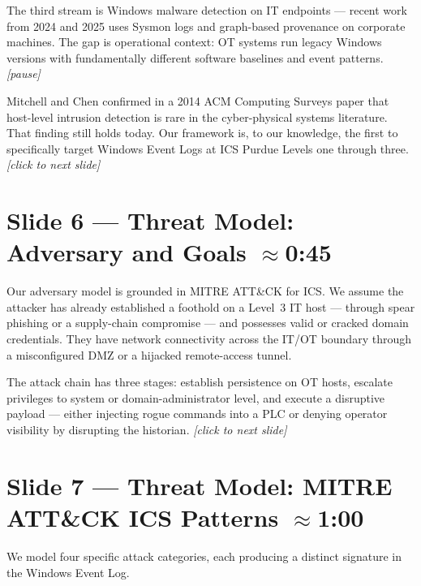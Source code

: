 \documentclass[14pt]{article}
\begin{document}
The third stream is Windows malware detection on IT endpoints --- recent work from 2024 and 2025 uses Sysmon logs and graph-based provenance on corporate machines. The gap is operational context: OT systems run legacy Windows versions with fundamentally different software baselines and event patterns. \textit{[pause]}

Mitchell and Chen confirmed in a 2014 ACM Computing Surveys paper that host-level intrusion detection is rare in the cyber-physical systems literature. That finding still holds today. Our framework is, to our knowledge, the first to specifically target Windows Event Logs at ICS Purdue Levels one through three. \textit{[click to next slide]}

\section*{Slide 6 — Threat Model: Adversary and Goals \hfill \normalfont\small $\approx$0:45}

Our adversary model is grounded in MITRE ATT\&CK for ICS. We assume the attacker has already established a foothold on a Level~3 IT host --- through spear phishing or a supply-chain compromise --- and possesses valid or cracked domain credentials. They have network connectivity across the IT/OT boundary through a misconfigured DMZ or a hijacked remote-access tunnel.

The attack chain has three stages: establish persistence on OT hosts, escalate privileges to system or domain-administrator level, and execute a disruptive payload --- either injecting rogue commands into a PLC or denying operator visibility by disrupting the historian. \textit{[click to next slide]}

\section*{Slide 7 — Threat Model: MITRE ATT\&CK ICS Patterns \hfill \normalfont\small $\approx$1:00}

We model four specific attack categories, each producing a distinct signature in the Windows Event Log.
\end{document}
